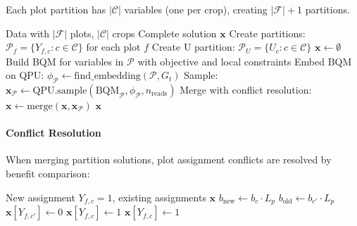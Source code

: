 \documentclass{oqireport}
\begin{document}
Each plot partition has $|\mathcal{C}|$ variables (one per crop), creating $|\mathcal{F}| + 1$ partitions.

\begin{algorithm}
\caption{Plot-Based Decomposition}
\begin{algorithmic}[1]
\Require Data with $|\mathcal{F}|$ plots, $|\mathcal{C}|$ crops
\Ensure Complete solution $\mathbf{x}$
\State Create partitions: $\mathcal{P}_f = \{Y_{f,c} : c \in \mathcal{C}\}$ for each plot $f$
\State Create U partition: $\mathcal{P}_U = \{U_c : c \in \mathcal{C}\}$
\State $\mathbf{x} \leftarrow \emptyset$
    \State Build BQM for variables in $\mathcal{P}$ with objective and local constraints
    \State Embed BQM on QPU: $\phi_{\mathcal{P}} \leftarrow \text{find\_embedding}(\mathcal{P}, G_t)$
    \State Sample: $\mathbf{x}_{\mathcal{P}} \leftarrow \text{QPU.sample}(\text{BQM}_{\mathcal{P}}, \phi_{\mathcal{P}}, n_{\text{reads}})$
    \State Merge with conflict resolution: $\mathbf{x} \leftarrow \text{merge}(\mathbf{x}, \mathbf{x}_{\mathcal{P}})$
\EndFor
\State \Return $\mathbf{x}$
\end{algorithmic}
\end{algorithm}

\paragraph{Conflict Resolution}

When merging partition solutions, plot assignment conflicts are resolved by benefit comparison:

\begin{algorithm}
\caption{Conflict Resolution for Plot Assignments}
\begin{algorithmic}[1]
\Require New assignment $Y_{f,c} = 1$, existing assignments $\mathbf{x}$
 
    \State $b_{\text{new}} \leftarrow b_c \cdot L_p$
    \State $b_{\text{old}} \leftarrow b_{c'} \cdot L_p$
        \State $\mathbf{x}[Y_{f,c'}] \leftarrow 0$ 
        \State $\mathbf{x}[Y_{f,c}] \leftarrow 1$
    \EndIf
\Else
    \State $\mathbf{x}[Y_{f,c}] \leftarrow 1$ 
\EndIf
\end{algorithmic}
\end{algorithm}
\end{document}
